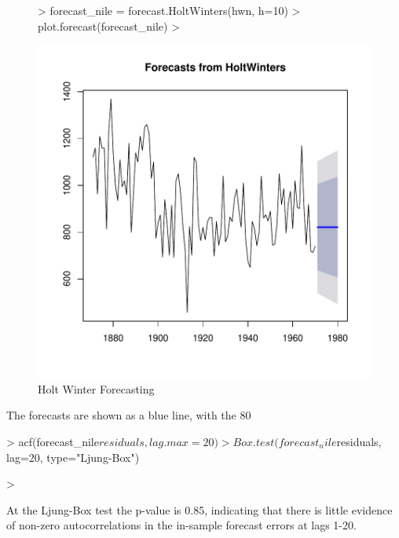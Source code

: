 \documentclass[11pt, a4paper]{article} %
\begin{document}
\begin{figure}
\centering
\begin{Schunk}
\begin{Sinput}
> forecast_nile = forecast.HoltWinters(hwn, h=10)
> plot.forecast(forecast_nile)
> 
\end{Sinput}
\end{Schunk}
\includegraphics{alles-040}
\caption{Holt Winter Forecasting}
\end{figure}

\noindent The forecasts are shown as a blue line, with the 80%


\begin{Schunk}
\begin{Sinput}
> acf(forecast_nile$residuals, lag.max = 20)
> Box.test(forecast_nile$residuals, lag=20, type="Ljung-Box")
\end{Sinput}
\begin{Sinput}
> 
\end{Sinput}
\end{Schunk}
\noindent At the Ljung-Box test the p-value is 0.85, indicating that there is little evidence of non-zero autocorrelations in the in-sample forecast errors at lags 1-20.
\end{document}

